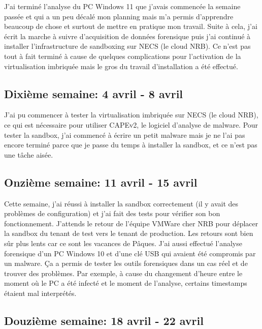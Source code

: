 J'ai terminé l'analyse du PC Windows 11 que j'avais commencée la semaine passée et qui a un peu décalé mon planning mais m'a permis d'apprendre beaucoup de chose et surtout de mettre en pratique mon travail. Suite à cela, j'ai écrit la marche à suivre d'acquisition de données forensique puis j'ai continué à installer l'infrastructure de sandboxing sur NECS (le cloud NRB). Ce n'est pas tout à fait terminé à cause de quelques complications pour l'activation de la virtualisation imbriquée mais le gros du travail d'installation a été effectué.



\subsection{Dixième semaine: 4 avril - 8 avril}

J'ai pu commencer à tester la virtualisation imbriquée sur NECS (le cloud NRB), ce qui est nécessaire pour utiliser CAPEv2, le logiciel d'analyse de malware. Pour tester la sandbox, j'ai commencé à écrire un petit malware mais je ne l'ai pas encore terminé parce que je passe du temps à installer la sandbox, et ce n'est pas une tâche aisée.



\subsection{Onzième semaine: 11 avril - 15 avril}

Cette semaine, j'ai réussi à installer la sandbox correctement (il y avait des problèmes de configuration) et j'ai fait des tests pour vérifier son bon fonctionnement. J'attends le retour de l'équipe VMWare cher NRB pour déplacer la sandbox du tenant de test vers le tenant de production. Les retours sont bien sûr plus lents car ce sont les vacances de Pâques. J'ai aussi effectué l'analyse forensique d'un PC Windows 10 et d'une clé USB qui avaient été compromis par un malware. Ça a permis de tester les outils forensiques dans un cas réel et de trouver des problèmes. Par exemple, à cause du changement d'heure entre le moment où le PC a été infecté et le moment de l'analyse, certains timestamps étaient mal interprétés.



\subsection{Douzième semaine: 18 avril - 22 avril}

